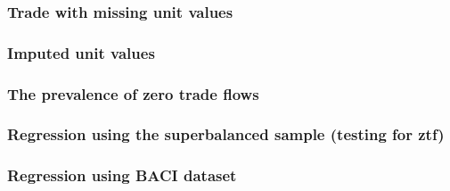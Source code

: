 \documentclass{beamer}
\begin{document}
\begin{frame}[plain]\frametitle{Trade with missing unit values}
	\begin{figure}[h!]
		\begin{center}
			\setlength{\fboxrule}{1pt} %
			\setlength{\fboxsep}{.1in} %
		\end{center}
	\end{figure}
\end{frame}


\begin{frame}[plain]\frametitle{Imputed unit values}
	\begin{figure}[h!]
		\begin{center}
			\setlength{\fboxrule}{1pt} %
			\setlength{\fboxsep}{.1in} %
		\end{center}
	\end{figure}
\end{frame}

\begin{frame}[plain]\frametitle{The prevalence of zero trade flows}
	\begin{figure}[h!]
		\begin{center}
			\setlength{\fboxrule}{1pt} %
			\setlength{\fboxsep}{.1in} %
		\end{center}
	\end{figure}
\end{frame}

\begin{frame}[plain]\frametitle{Regression using the superbalanced sample (testing for ztf)}
	\begin{figure}[h!]
		\begin{center}
			\setlength{\fboxrule}{1pt} %
			\setlength{\fboxsep}{.1in} %
		\end{center}
	\end{figure}
\end{frame}

\begin{frame}[plain]\frametitle{Regression using BACI dataset}
	\begin{figure}[h!]
		\begin{center}
			\setlength{\fboxrule}{1pt} %
			\setlength{\fboxsep}{.1in} %
		\end{center}
	\end{figure}
\end{frame}
\end{document}
